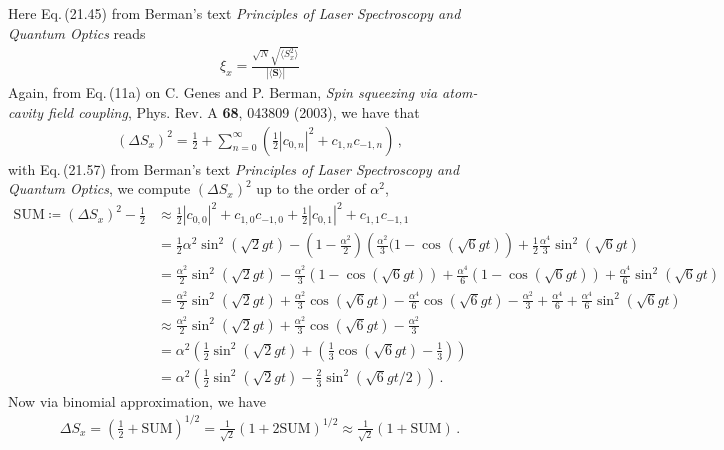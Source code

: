 \documentclass[11pt, oneside]{book}
\theoremstyle{break}
\theoremstyle{break}
\begin{document}
\chapter{}
Here Eq.\,(21.45) from Berman's text \textit{Principles of Laser Spectroscopy and Quantum Optics} reads
\begin{align*}
\xi_x = \frac{\sqrt{N}\sqrt{\langle S_x^2\rangle}}{|\langle \mathbf{S}\rangle|}
\end{align*}
Again, from Eq.\,(11a) on C. Genes and P. Berman, \textit{Spin squeezing via atom-cavity field coupling}, Phys. Rev. A \textbf{68}, 043809 (2003), we have that 
\begin{align*}
(\Delta S_x)^2 = \frac{1}{2}+ \sum_{n=0}^\infty \left( \frac{1}{2}|c_{0,n}|^2 + c_{1,n}c_{-1,n}\right)\,,
\end{align*}
with Eq.\,(21.57) from Berman's text \textit{Principles of Laser Spectroscopy and Quantum Optics}, we compute $(\Delta S_x)^2$ up to the order of $\alpha^2$,
\begin{align*}
\text{SUM}\coloneqq (\Delta S_x)^2-\frac{1}{2}
&\approx \frac{1}{2}|c_{0,0}|^2 + c_{1,0} c_{-1,0} + \frac{1}{2}|c_{0,1}|^2 +c_{1,1}c_{-1,1}\\
&= \frac{1}{2}\alpha^2 \sin^2(\sqrt{2}gt) - \left(1 - \frac{\alpha^2 }{2}\right) \left( \frac{\alpha^2}{3} (1- \cos(\sqrt{6}gt)\right)+ \frac{1}{2}\frac{\alpha^4}{3}\sin^2(\sqrt{6}gt)\\
&= \frac{\alpha^2}{2}\sin^2(\sqrt{2}gt) - \frac{\alpha^2}{3}\left(1 - \cos(\sqrt{6}gt)\right) + \frac{\alpha^4}{6}\left(1 - \cos(\sqrt{6}gt) \right) + \frac{\alpha^4}{6}\sin^2(\sqrt{6}gt)\\
&= \frac{\alpha^2}{2}\sin^2(\sqrt{2}gt) + \frac{\alpha^2}{3}\cos(\sqrt{6}gt) - \frac{\alpha^4}{6}\cos(\sqrt{6}gt) -\frac{\alpha^2}{3} + \frac{\alpha^4}{6}+\frac{\alpha^4}{6}\sin^2(\sqrt{6}gt)\\
&\approx \frac{\alpha^2}{2}\sin^2(\sqrt{2}gt) + \frac{\alpha^2}{3}\cos(\sqrt{6}gt) -\frac{\alpha^2}{3}\\
&=  \alpha^2\left( \frac{1}{2}\sin^2(\sqrt{2}gt) + \left(\frac{1}{3}\cos(\sqrt{6}gt) - \frac{1}{3}\right)\right)\\
&=\alpha^2\left( \frac{1}{2}\sin^2(\sqrt{2}gt) -\frac{2}{3}\sin^2(\sqrt{6}gt/2)\right)\,.
\end{align*}
Now via binomial approximation, we have
\begin{align*}
\Delta S_x = \left( \frac{1}{2}+ \text{SUM}\right)^{1/2} = \frac{1}{\sqrt{2}}\left( 1+ 2\text{SUM}\right)^{1/2} \approx \frac{1}{\sqrt{2}}\left( 1 + \text{SUM}\right)\,.
\end{align*}
\end{document}
